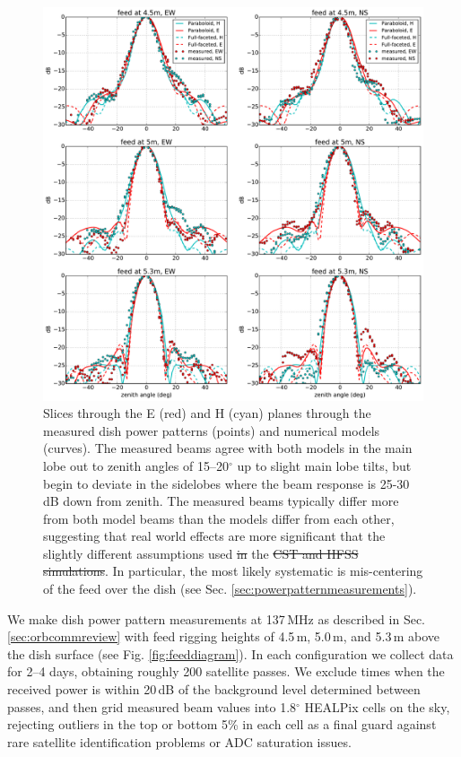 \documentclass{emulateapj}
\providecommand{\DIFadd}[1]{{\protect\color{blue}\uwave{#1}}} %
\providecommand{\DIFdel}[1]{{\protect\color{red}\sout{#1}}}                      %
\providecommand{\DIFaddFL}[1]{\DIFadd{#1}} %
\providecommand{\DIFdelFL}[1]{\DIFdel{#1}} %
\providecommand{\DIFaddbeginFL}{} %
\providecommand{\DIFaddendFL}{} %
\providecommand{\DIFdelbeginFL}{} %
\providecommand{\DIFdelendFL}{} %
\begin{document}
\begin{figure}[t]
\centering
\includegraphics[width=6.5in]{measured_beams_and_models_slices.pdf}
\caption{Slices through the E (red) and H (cyan) planes through the measured dish power patterns (points) and numerical models (curves). The measured beams agree with both models in the main lobe out to zenith angles of 15--20$^\circ$ up to slight main lobe tilts, but begin to deviate in the sidelobes where the beam response is 25-30\,dB down from zenith. The measured beams typically differ more from both model beams than the models differ from each other, suggesting that real world effects are more significant that the slightly different assumptions used \DIFdelbeginFL \DIFdelFL{in }\DIFdelendFL the \DIFdelbeginFL \DIFdelFL{CST and HFSS simulations}\DIFdelendFL \DIFaddbeginFL \DIFaddFL{two beam models}\DIFaddendFL . In particular, the most likely systematic is mis-centering of the feed over the dish (see Sec. \ref{sec:powerpatternmeasurements}).}
\label{fig:measuredbeamslices}
\end{figure}

We make dish power pattern measurements at 137\,MHz as described in Sec. \ref{sec:orbcommreview} with feed rigging heights of 4.5\,m, 5.0\,m, and 5.3\,m above the dish surface (see Fig. \ref{fig:feeddiagram}). In each configuration we collect data for 2--4 days, obtaining roughly 200 satellite passes. We exclude times when the received power is within 20\,dB of the background level determined between passes, and then grid measured beam values into 1.8$^\circ$ HEALPix cells on the sky, rejecting outliers in the top or bottom 5\% in each cell as a final guard against rare satellite identification problems or ADC saturation issues.
\end{document}
